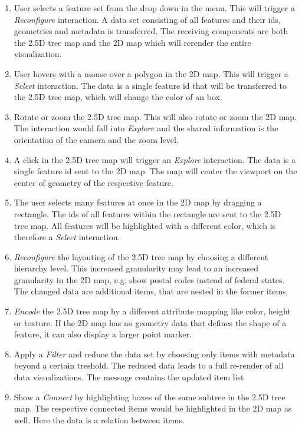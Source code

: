 \documentclass{article}
\newcommand{\map}{\textsc{2D} map}
\newcommand{\tmap}{\textsc{2.5D} tree map}
\begin{document}
    \begin{enumerate}
      \item
        User selects a feature set from the drop down in the menu. This will trigger a \emph{Reconfigure} interaction. A data set consisting of all features and their ids, geometries and metadata is transferred. The receiving components are both the \tmap{} and the \map{} which will rerender the entire visualization.
      \item
        User hovers with a mouse over a polygon in the \map{}. This will trigger a \emph{Select} interaction. The data is a single feature id that will be transferred to the \tmap{}, which will change the color of an box.
      \item
        Rotate or zoom the \tmap{}. This will also rotate or zoom the \map{}. The interaction would fall into \emph{Explore} and the shared information is the orientation of the camera and the zoom level.
      \item
        A click in the \tmap{} will trigger an \emph{Explore} interaction. The data is a single feature id sent to the \map{}. The map will center the viewport on the center of geometry of the respective feature.
      \item
        The user selects many features at once in the \map{} by dragging a rectangle. The ids of all features within the rectangle are sent to the \tmap{}. All features will be highlighted with a different color, which is therefore a \emph{Select} interaction.
      \item
        \emph{Reconfigure} the layouting of the \tmap{} by choosing a different hierarchy level. This increased granularity may lead to an increased granularity in the \map{}, e.g. show postal codes instead of federal states. The changed data are additional items, that are nested in the former items.
      \item
        \emph{Encode} the \tmap{} by a different attribute mapping like color, height or texture. If the \map{} has no geometry data that defines the shape of a feature, it can also display a larger point marker. 
      \item
        Apply a \emph{Filter} and reduce the data set by choosing only items with metadata beyond a certain treshold. The reduced data leads to a full re-render of all data visualizations. The message contains the updated item list
  \item
    Show a \emph{Connect} by highlighting boxes of the same subtree in the \tmap{}. The respective connected items would be highlighted in the \map{} as well. Here the data is a relation between items.
    \end{enumerate}
\end{document}
